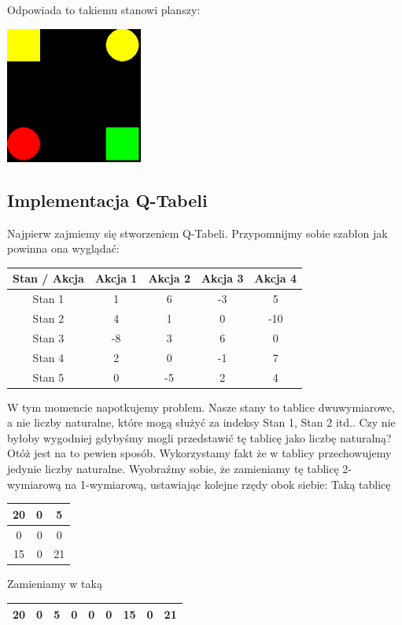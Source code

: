 \documentclass[a4paper,12pt]{article}
\begin{document}
Odpowiada to takiemu stanowi planszy:

\includegraphics[width=45mm]{przyklad3.png}

\subsection{Implementacja Q-Tabeli}

Najpierw zajmiemy się stworzeniem Q-Tabeli. Przypomnijmy sobie szablon jak powinna ona wyglądać:

\begin{center}
\begin{tabular}{ |c|c|c|c|c| }
\hline
Stan /  Akcja & Akcja 1 & Akcja 2 & Akcja 3 & Akcja 4 \\
\hline
Stan 1 & \small{1} & \small{6} & \small{-3} & \small{5} \\
\hline
Stan 2 & \small{4} & \small{1} & \small{0} & \small{-10} \\
\hline
Stan 3 & \small{-8} & \small{3} & \small{6} & \small{0} \\
\hline
Stan 4 & \small{2} & \small{0} & \small{-1} & \small{7} \\
\hline
Stan 5 & \small{0} & \small{-5} & \small{2} & \small{4} \\
\hline 
\end{tabular}
\newline
\end{center} 

W tym momencie napotkujemy problem. Nasze stany to tablice dwuwymiarowe, a nie liczby naturalne, które mogą służyć za indeksy Stan 1, Stan 2 itd.. Czy nie byłoby wygodniej gdybyśmy mogli przedstawić tę tablicę jako liczbę naturalną? Otóż jest na to pewien sposób. Wykorzystamy fakt że w tablicy przechowujemy jedynie liczby naturalne. Wyobraźmy sobie, że zamieniamy tę tablicę 2-wymiarową na 1-wymiarową, ustawiając kolejne rzędy obok siebie:
\newline \newline Taką tablicę
\begin{center}
\begin{tabular}{ |c|c|c| }
\hline
20 & 0 & 5 \\
\hline
0 & 0 & 0 \\
\hline
15 & 0 & 21 \\
\hline
\end{tabular}
\end{center} 
Zamieniamy w taką
\begin{center}
\begin{tabular}{ |c|c|c|c|c|c|c|c|c| }
\hline
20 & 0 & 5 & 0 & 0 & 0 & 15 & 0 & 21 \\
\hline
\end{tabular}
\newline
\end{center} 
\end{document}
